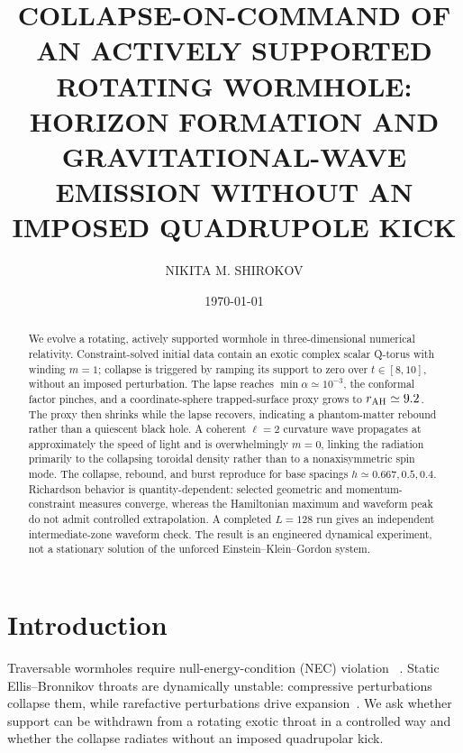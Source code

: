 \documentclass[twocolumn,aps,prd,nofootinbib,natbib]{revtex4-2}
\begin{document}
\title{\MakeTextUppercase{Collapse-on-Command of an Actively Supported Rotating
Wormhole: Horizon Formation and Gravitational-Wave Emission Without an Imposed
Quadrupole Kick}}

\author{\MakeTextUppercase{Nikita M. Shirokov}}
\date{\today}

\begin{abstract}
We evolve a rotating, actively supported wormhole in three-dimensional numerical
relativity. Constraint-solved initial data contain an exotic complex scalar
Q-torus with winding $m=1$; collapse is triggered by ramping its support to zero
over $t\in[8,10]$, without an imposed perturbation. The lapse reaches
$\min\alpha\simeq10^{-3}$, the conformal factor pinches, and a coordinate-sphere
trapped-surface proxy grows to $r_{\rm AH}\simeq9.2$. The proxy then shrinks while
the lapse recovers, indicating a phantom-matter rebound rather than a quiescent
black hole. A coherent $\ell=2$ curvature wave propagates at approximately the
speed of light and is overwhelmingly $m=0$, linking the radiation primarily to
the collapsing toroidal density rather than to a nonaxisymmetric spin mode.
The collapse, rebound, and burst reproduce for base spacings
$h\simeq0.667,0.5,0.4$. Richardson behavior is quantity-dependent: selected
geometric and momentum-constraint measures converge, whereas the Hamiltonian
maximum and waveform peak do not admit controlled extrapolation. A completed
$L=128$ run gives an independent intermediate-zone waveform check. The result is
an engineered dynamical experiment, not a stationary solution of the unforced
Einstein--Klein--Gordon system.
\end{abstract}

\maketitle

\section{Introduction}
Traversable wormholes require null-energy-condition (NEC) violation
~\cite{morris88}. Static Ellis--Bronnikov throats are dynamically unstable:
compressive perturbations collapse them, while rarefactive perturbations drive
expansion~\cite{ellis73,bronnikov73,shinkai02,gonzalez09}. We ask whether support
can be withdrawn from a rotating exotic throat in a controlled way and whether
the collapse radiates without an imposed quadrupolar kick.
\end{document}
